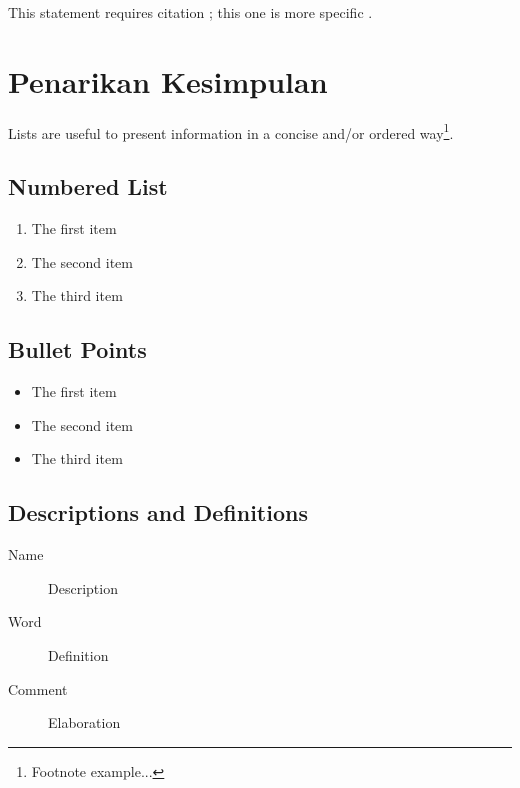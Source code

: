 \documentclass[11pt,fleqn]{book} %
\begin{document}
This statement requires citation \cite{book_key}; this one is more specific \cite[122]{article_key}.


\section{Penarikan Kesimpulan}

Lists are useful to present information in a concise and/or ordered way\footnote{Footnote example...}.

\subsection{Numbered List}

\begin{enumerate}
\item The first item
\item The second item
\item The third item
\end{enumerate}

\subsection{Bullet Points}

\begin{itemize}
\item The first item
\item The second item
\item The third item
\end{itemize}

\subsection{Descriptions and Definitions}

\begin{description}
\item[Name] Description
\item[Word] Definition
\item[Comment] Elaboration
\end{description}

\end{document}
